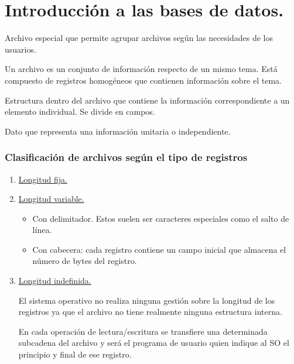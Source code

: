 \chapter{Introducción a las bases de datos.}

\begin{definicion}[Directorio]
Archivo especial que permite agrupar archivos según las necesidades de los usuarios.
\end{definicion}

\begin{definicion}[Archivo] Un archivo es un conjunto de información respecto de un mismo tema. Está compuesto de registros homogéneos que contienen información sobre el tema.
\end{definicion}

\begin{definicion}[Registro] Estructura dentro del archivo que contiene la información correspondiente a un elemento individual. Se divide en campos.
\end{definicion}

\begin{definicion}[Campo] Dato que representa una información unitaria o independiente.
\end{definicion}

\subsection*{Clasificación de archivos según el tipo de registros}
\begin{enumerate}
    \item \underline{Longitud fija.}
    \item \underline{Longitud variable.}
    \begin{itemize}
        \item Con delimitador. Estos suelen ser caracteres especiales como el salto de línea.
        \item Con cabecera: cada registro contiene un campo inicial que almacena el número de bytes del registro.
    \end{itemize}
    \item \underline{Longitud indefinida.}
    
    El sistema operativo no realiza ninguna gestión sobre la longitud de los registros ya que el archivo no tiene realmente ninguna estructura interna.

    En cada operación de lectura/escritura se transfiere una determinada subcadena del archivo y será el programa de usuario quien indique al SO el principio y final de ese registro.
\end{enumerate}

